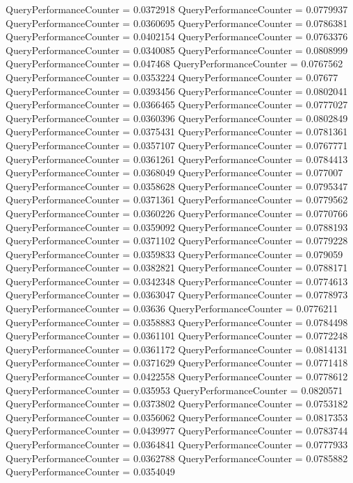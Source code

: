 \documentclass[9pt]{article}
\theoremstyle{plain}
\theoremstyle{definition}
\theoremstyle{remark}
\numberwithin{equation}{section}
\begin{document}
QueryPerformanceCounter  =  0.0372918
QueryPerformanceCounter  =  0.0779937
QueryPerformanceCounter  =  0.0360695
QueryPerformanceCounter  =  0.0786381
QueryPerformanceCounter  =  0.0402154
QueryPerformanceCounter  =  0.0763376
QueryPerformanceCounter  =  0.0340085
QueryPerformanceCounter  =  0.0808999
QueryPerformanceCounter  =  0.047468
QueryPerformanceCounter  =  0.0767562
QueryPerformanceCounter  =  0.0353224
QueryPerformanceCounter  =  0.07677
QueryPerformanceCounter  =  0.0393456
QueryPerformanceCounter  =  0.0802041
QueryPerformanceCounter  =  0.0366465
QueryPerformanceCounter  =  0.0777027
QueryPerformanceCounter  =  0.0360396
QueryPerformanceCounter  =  0.0802849
QueryPerformanceCounter  =  0.0375431
QueryPerformanceCounter  =  0.0781361
QueryPerformanceCounter  =  0.0357107
QueryPerformanceCounter  =  0.0767771
QueryPerformanceCounter  =  0.0361261
QueryPerformanceCounter  =  0.0784413
QueryPerformanceCounter  =  0.0368049
QueryPerformanceCounter  =  0.077007
QueryPerformanceCounter  =  0.0358628
QueryPerformanceCounter  =  0.0795347
QueryPerformanceCounter  =  0.0371361
QueryPerformanceCounter  =  0.0779562
QueryPerformanceCounter  =  0.0360226
QueryPerformanceCounter  =  0.0770766
QueryPerformanceCounter  =  0.0359092
QueryPerformanceCounter  =  0.0788193
QueryPerformanceCounter  =  0.0371102
QueryPerformanceCounter  =  0.0779228
QueryPerformanceCounter  =  0.0359833
QueryPerformanceCounter  =  0.079059
QueryPerformanceCounter  =  0.0382821
QueryPerformanceCounter  =  0.0788171
QueryPerformanceCounter  =  0.0342348
QueryPerformanceCounter  =  0.0774613
QueryPerformanceCounter  =  0.0363047
QueryPerformanceCounter  =  0.0778973
QueryPerformanceCounter  =  0.03636
QueryPerformanceCounter  =  0.0776211
QueryPerformanceCounter  =  0.0358883
QueryPerformanceCounter  =  0.0784498
QueryPerformanceCounter  =  0.0361101
QueryPerformanceCounter  =  0.0772248
QueryPerformanceCounter  =  0.0361172
QueryPerformanceCounter  =  0.0814131
QueryPerformanceCounter  =  0.0371629
QueryPerformanceCounter  =  0.0771418
QueryPerformanceCounter  =  0.0422558
QueryPerformanceCounter  =  0.0778612
QueryPerformanceCounter  =  0.035953
QueryPerformanceCounter  =  0.0820571
QueryPerformanceCounter  =  0.0373802
QueryPerformanceCounter  =  0.0753182
QueryPerformanceCounter  =  0.0356062
QueryPerformanceCounter  =  0.0817353
QueryPerformanceCounter  =  0.0439977
QueryPerformanceCounter  =  0.0783744
QueryPerformanceCounter  =  0.0364841
QueryPerformanceCounter  =  0.0777933
QueryPerformanceCounter  =  0.0362788
QueryPerformanceCounter  =  0.0785882
QueryPerformanceCounter  =  0.0354049
\end{document}
